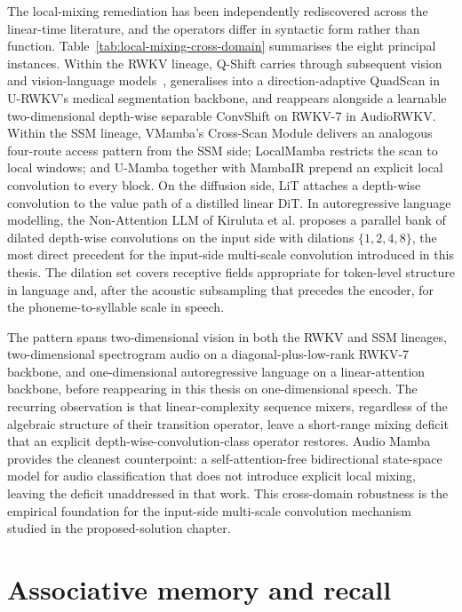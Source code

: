 The local-mixing remediation has been independently rediscovered
across the linear-time literature, and the operators differ in
syntactic form rather than function.
Table~\ref{tab:local-mixing-cross-domain} summarises the eight
principal instances. Within the RWKV lineage, Q-Shift carries
through subsequent vision and vision-language
models~\cite{fei2024diffusionrwkv,hou2024visualrwkv,gu2024rwkvclip},
generalises into a direction-adaptive QuadScan in U-RWKV's
medical segmentation backbone, and reappears alongside a
learnable two-dimensional depth-wise separable ConvShift on
RWKV-7 in AudioRWKV. Within the SSM lineage, VMamba's Cross-Scan
Module delivers an analogous four-route access pattern from the
SSM side; LocalMamba restricts the scan to local windows; and
U-Mamba together with MambaIR prepend an explicit local
convolution to every block. On the diffusion side, LiT attaches
a depth-wise convolution to the value path of a distilled linear
DiT. In autoregressive language modelling, the Non-Attention
LLM of Kiruluta et al. proposes a parallel bank of dilated
depth-wise convolutions on the input side with dilations $\{1, 2,
4, 8\}$, the most direct precedent for the input-side multi-scale
convolution introduced in this thesis. The dilation set covers
receptive fields appropriate for token-level structure in
language and, after the acoustic subsampling that precedes the
encoder, for the phoneme-to-syllable scale in speech.

The pattern spans two-dimensional vision in both the RWKV and SSM
lineages, two-dimensional spectrogram audio on a
diagonal-plus-low-rank RWKV-7 backbone, and one-dimensional
autoregressive language on a linear-attention backbone, before
reappearing in this thesis on one-dimensional speech. The
recurring observation is that linear-complexity sequence mixers,
regardless of the algebraic structure of their transition
operator, leave a short-range mixing deficit that an explicit
depth-wise-convolution-class operator restores. Audio
Mamba~\cite{erol2024audiomamba} provides the cleanest
counterpoint: a self-attention-free bidirectional state-space
model for audio classification that does not introduce explicit
local mixing, leaving the deficit unaddressed in that work. This
cross-domain robustness is the empirical foundation for the
input-side multi-scale convolution mechanism studied in the
proposed-solution chapter.

\section{Associative memory and recall}

